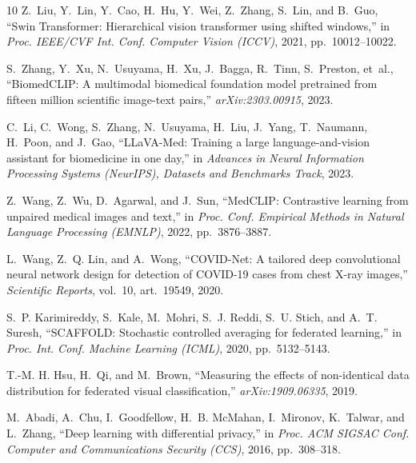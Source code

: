 \documentclass[letterpaper, conference]{IEEEtran}
\begin{document}
\begin{thebibliography}{10}
Z.~Liu, Y.~Lin, Y.~Cao, H.~Hu, Y.~Wei, Z.~Zhang, S.~Lin, and B.~Guo,
``Swin Transformer: Hierarchical vision transformer using shifted windows,''
in \emph{Proc. IEEE/CVF Int. Conf. Computer Vision (ICCV)}, 2021, pp.~10012--10022.

S.~Zhang, Y.~Xu, N.~Usuyama, H.~Xu, J.~Bagga, R.~Tinn, S.~Preston, et~al.,
``BiomedCLIP: A multimodal biomedical foundation model pretrained from fifteen
million scientific image-text pairs,'' \emph{arXiv:2303.00915}, 2023.

C.~Li, C.~Wong, S.~Zhang, N.~Usuyama, H.~Liu, J.~Yang, T.~Naumann, H.~Poon, and J.~Gao,
``LLaVA-Med: Training a large language-and-vision assistant for biomedicine in one day,''
in \emph{Advances in Neural Information Processing Systems (NeurIPS), Datasets and
Benchmarks Track}, 2023.

Z.~Wang, Z.~Wu, D.~Agarwal, and J.~Sun,
``MedCLIP: Contrastive learning from unpaired medical images and text,''
in \emph{Proc. Conf. Empirical Methods in Natural Language Processing (EMNLP)},
2022, pp.~3876--3887.

L.~Wang, Z.~Q. Lin, and A.~Wong,
``COVID-Net: A tailored deep convolutional neural network design for detection of
COVID-19 cases from chest X-ray images,''
\emph{Scientific Reports}, vol.~10, art.~19549, 2020.

S.~P. Karimireddy, S.~Kale, M.~Mohri, S.~J. Reddi, S.~U. Stich, and A.~T. Suresh,
``SCAFFOLD: Stochastic controlled averaging for federated learning,''
in \emph{Proc. Int. Conf. Machine Learning (ICML)}, 2020, pp.~5132--5143.

T.-M. H. Hsu, H.~Qi, and M.~Brown,
``Measuring the effects of non-identical data distribution for federated visual
classification,'' \emph{arXiv:1909.06335}, 2019.

M.~Abadi, A.~Chu, I.~Goodfellow, H.~B. McMahan, I.~Mironov, K.~Talwar, and L.~Zhang,
``Deep learning with differential privacy,''
in \emph{Proc. ACM SIGSAC Conf. Computer and Communications Security (CCS)}, 2016,
pp.~308--318.

\end{thebibliography}
\end{document}
